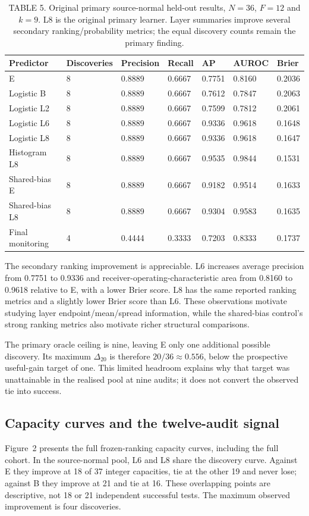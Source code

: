 \begin{table}[t]
\caption{TABLE 5. Original primary source-normal held-out results, $N=36$, $F=12$ and $k=9$. L8 is the original primary learner. Layer summaries improve several secondary ranking/probability metrics; the equal discovery counts remain the primary finding.}
\label{tab:primary}
\centering\small
\begin{tabular}{lllllll}
\toprule Predictor & Discoveries & Precision & Recall & AP & AUROC & Brier\\\midrule
E &8&0.8889&0.6667&0.7751&0.8160&0.2036\\
Logistic B &8&0.8889&0.6667&0.7612&0.7847&0.2063\\
Logistic L2 &8&0.8889&0.6667&0.7599&0.7812&0.2061\\
Logistic L6 &8&0.8889&0.6667&0.9336&0.9618&0.1648\\
Logistic L8 &8&0.8889&0.6667&0.9336&0.9618&0.1647\\
Histogram L8 &8&0.8889&0.6667&0.9535&0.9844&0.1531\\
Shared-bias E &8&0.8889&0.6667&0.9182&0.9514&0.1633\\
Shared-bias L8 &8&0.8889&0.6667&0.9304&0.9583&0.1635\\
Final monitoring &4&0.4444&0.3333&0.7203&0.8333&0.1737\\\bottomrule
\end{tabular}
\end{table}

The secondary ranking improvement is appreciable. L6 increases average precision from 0.7751 to 0.9336 and receiver-operating-characteristic area from 0.8160 to 0.9618 relative to E, with a lower Brier score. L8 has the same reported ranking metrics and a slightly lower Brier score than L6. These observations motivate studying layer endpoint/mean/spread information, while the shared-bias control's strong ranking metrics also motivate richer structural comparisons.

The primary oracle ceiling is nine, leaving E only one additional possible discovery. Its maximum $\Delta_{20}$ is therefore $20/36\approx0.556$, below the prospective useful-gain target of one. This limited headroom explains why that target was unattainable in the realised pool at nine audits; it does not convert the observed tie into success.

\subsection{Capacity curves and the twelve-audit signal}
Figure~2 presents the full frozen-ranking capacity curves, including the full cohort. In the source-normal pool, L6 and L8 share the discovery curve. Against E they improve at 18 of 37 integer capacities, tie at the other 19 and never lose; against B they improve at 21 and tie at 16. These overlapping points are descriptive, not 18 or 21 independent successful tests. The maximum observed improvement is four discoveries.

